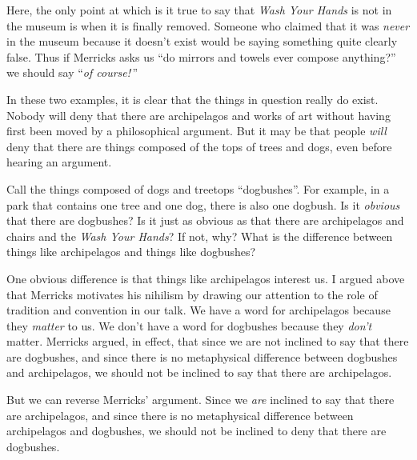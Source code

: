\documentclass[11pt]{article}
\begin{document}
\begin{spacing}{1.25}
Here, the only point at which is it true to say that {\em Wash Your
  Hands} is not in the museum is when it is finally removed.  Someone
who claimed that it was {\em never} in the museum because it doesn't
exist would be saying something quite clearly false.  Thus if Merricks
asks us ``do mirrors and towels ever compose anything?'' we should say
``{\em of course!}\,''

In these two examples, it is clear that the things in question really
do exist.  Nobody will deny that there are archipelagos and works of
art without having first been moved by a philosophical argument.  But
it may be that people {\em will} deny that there are things composed
of the tops of trees and dogs, even before hearing an argument.

Call the things composed of dogs and treetops ``dogbushes''.  For
example, in a park that contains one tree and one dog, there is also
one dogbush.  Is it {\em obvious} that there are dogbushes?  Is it
just as obvious as that there are archipelagos and chairs and the {\em
  Wash Your Hands}?  If not, why?  What is the difference between
things like archipelagos and things like dogbushes?

One obvious difference is that things like archipelagos interest us.
I argued above that Merricks motivates his nihilism by drawing our
attention to the role of tradition and convention in our talk.  We
have a word for archipelagos because they {\em matter} to us.  We
don't have a word for dogbushes because they {\em don't} matter.
Merricks argued, in effect, that since we are not inclined to say that
there are dogbushes, and since there is no metaphysical difference
between dogbushes and archipelagos, we should not be inclined to say
that there are archipelagos.

But we can reverse Merricks' argument.  Since we {\em are} inclined to
say that there are archipelagos, and since there is no metaphysical
difference between archipelagos and dogbushes, we should not be
inclined to deny that there are dogbushes.


\end{spacing}
\end{document}
